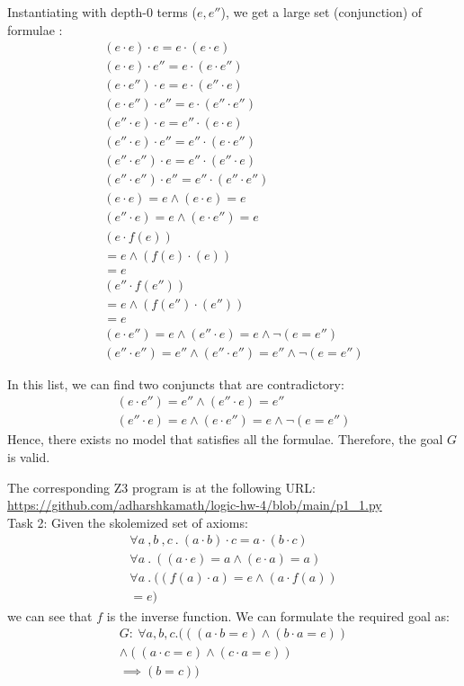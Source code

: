 \documentclass[12pt,letterpaper, onecolumn]{exam}
\newcommand{\link}[1]{{\color{blue}\href{#1}{#1}}}
\begin{document}
\begin{questions}
	Instantiating with depth-0 terms ($e, e''$), we get a large set (conjunction) of formulae :
	\begin{align*}
		(e \cdot e) \cdot e = e \cdot (e \cdot e) \\
		(e \cdot e) \cdot e'' = e \cdot (e \cdot e'') \\
		(e \cdot e'') \cdot e = e \cdot (e'' \cdot e) \\
		(e \cdot e'') \cdot e'' = e \cdot (e'' \cdot e'') \\
		(e'' \cdot e) \cdot e = e'' \cdot (e \cdot e) \\
		(e'' \cdot e) \cdot e'' = e'' \cdot (e \cdot e'') \\
		(e'' \cdot e'') \cdot e = e'' \cdot (e'' \cdot e) \\
		(e'' \cdot e'') \cdot e'' = e'' \cdot (e'' \cdot e'') \\
		(e \cdot e) = e \land (e \cdot e) = e \\
		(e'' \cdot e) = e \land (e \cdot e'') = e \\
		(e \cdot f(e))  \\ = e \land (f(e) \cdot (e))  \\ = e \\
		(e'' \cdot f(e''))  \\ = e \land (f(e'') \cdot (e''))  \\ = e \\
		(e \cdot e'') = e \land (e'' \cdot e) = e \land \neg (e = e'') \\
		(e'' \cdot e'') = e'' \land (e'' \cdot e'') = e'' \land \neg (e = e'')
	\end{align*}
	
	In this list,
	we can find two conjuncts that are contradictory:
	\begin{align*}
		(e \cdot e'') = e'' \land (e'' \cdot e) = e'' \\
		(e'' \cdot e) = e \land (e \cdot e'') = e \land \neg (e = e'')
	\end{align*}
	Hence, there exists no model that satisfies all the formulae.
	Therefore, the goal $G$ is valid.

	The corresponding Z3 program is at the following URL:
	\link{https://github.com/adharshkamath/logic-hw-4/blob/main/p1\_1.py} \\
	

	Task 2:
	Given the skolemized set of axioms:
	\begin{align*}
		\forall a \:, b \:, c \:.\: (a \cdot b) \cdot c = a \cdot (b \cdot c) \\
		\forall a \:.\: ((a \cdot e) = a \land (e \cdot a) = a) \\
		\forall a \:.\: ((f(a)\cdot a) = e \land (a \cdot f(a))  \\ = e)
	\end{align*}
	we can see that $f$ is the inverse function. 
	We can formulate the required goal as:
	\begin{align*}
		G : \: \forall a, b, c . (((a \cdot b = e) \land (b \cdot a = e))  \\ \land (
			(a \cdot c = e) \land (c \cdot a = e))  \\ \implies (b = c)) 
	\end{align*}


\end{questions}
\end{document}
